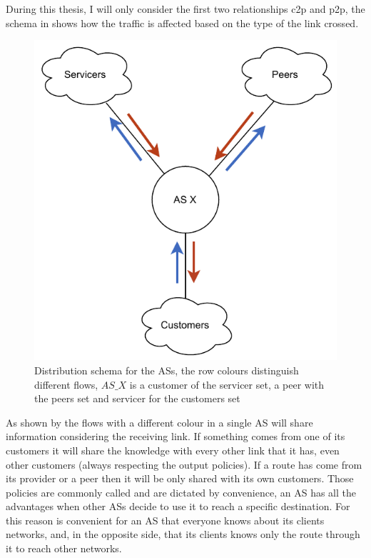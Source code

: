 During this thesis, I will only consider the first two relationships \ac{c2p} and
\ac{p2p}, the schema in  shows how the traffic is affected
based on the type of the link crossed.

\begin{figure}[ht]
    \centering
    \includegraphics[scale=0.75]{images/BGP/ASKnowledgeDistribution.pdf}
	\caption{Distribution schema for the \acp{AS}, the row colours distinguish
	different flows, $AS\_X$ is a customer of the servicer set, a peer with the
	peers set and servicer for the customers set}
    \label{fig:AS_flow}
\end{figure}


As shown by the flows with a different colour in  a single
\ac{AS} will share information considering the receiving link.
If something comes from one of its customers it will share the knowledge with
every other link that it has, even other customers (always respecting the output policies).
If a route has come from its provider or a peer then it will be only shared with
its own customers.
Those policies are commonly called  and are dictated by convenience,
an \ac{AS} has all the advantages when
other \acp{AS} decide to use it to reach a specific destination.
For this reason is convenient for an \ac{AS} that everyone knows about its clients
networks, and, in the opposite side, that its clients knows only the route
through it to reach other networks.

